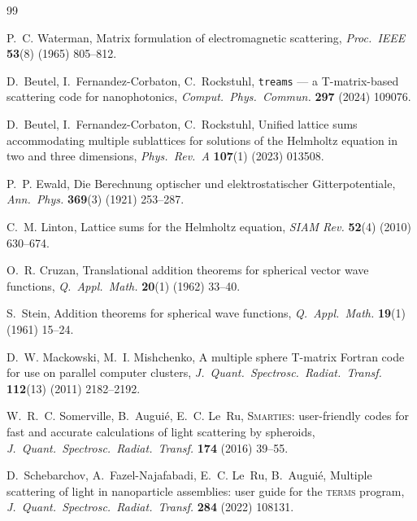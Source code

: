 \documentclass[11pt,a4paper]{article}
\theoremstyle{plain}
\theoremstyle{definition}
\begin{document}
\begin{thebibliography}{99}
\small

P.~C. Waterman,
\newblock Matrix formulation of electromagnetic scattering,
\newblock \emph{Proc.\ IEEE} \textbf{53}(8) (1965) 805--812.

D.~Beutel, I.~Fernandez-Corbaton, C.~Rockstuhl,
\newblock \texttt{treams} --- a T-matrix-based scattering code for nanophotonics,
\newblock \emph{Comput.\ Phys.\ Commun.} \textbf{297} (2024) 109076.

D.~Beutel, I.~Fernandez-Corbaton, C.~Rockstuhl,
\newblock Unified lattice sums accommodating multiple sublattices for solutions
of the Helmholtz equation in two and three dimensions,
\newblock \emph{Phys.\ Rev.\ A} \textbf{107}(1) (2023) 013508.

P.~P. Ewald,
\newblock Die Berechnung optischer und elektrostatischer Gitterpotentiale,
\newblock \emph{Ann.\ Phys.} \textbf{369}(3) (1921) 253--287.

C.~M. Linton,
\newblock Lattice sums for the Helmholtz equation,
\newblock \emph{SIAM Rev.} \textbf{52}(4) (2010) 630--674.

O.~R. Cruzan,
\newblock Translational addition theorems for spherical vector wave functions,
\newblock \emph{Q.\ Appl.\ Math.} \textbf{20}(1) (1962) 33--40.

S.~Stein,
\newblock Addition theorems for spherical wave functions,
\newblock \emph{Q.\ Appl.\ Math.} \textbf{19}(1) (1961) 15--24.

D.~W. Mackowski, M.~I. Mishchenko,
\newblock A multiple sphere T-matrix Fortran code for use on parallel computer
clusters,
\newblock \emph{J.\ Quant.\ Spectrosc.\ Radiat.\ Transf.} \textbf{112}(13) (2011)
2182--2192.

W.~R.~C. Somerville, B.~Augui\'e, E.~C. Le~Ru,
\newblock \textsc{Smarties}: user-friendly codes for fast and accurate
calculations of light scattering by spheroids,
\newblock \emph{J.\ Quant.\ Spectrosc.\ Radiat.\ Transf.} \textbf{174} (2016)
39--55.

D.~Schebarchov, A.~Fazel-Najafabadi, E.~C. Le~Ru, B.~Augui\'e,
\newblock Multiple scattering of light in nanoparticle assemblies: user guide for
the \textsc{terms} program,
\newblock \emph{J.\ Quant.\ Spectrosc.\ Radiat.\ Transf.} \textbf{284} (2022)
108131.


\end{thebibliography}
\end{document}
